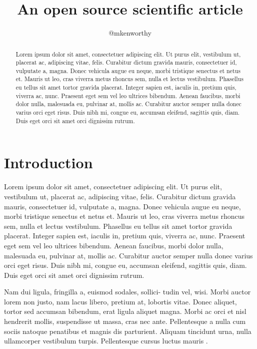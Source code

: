 \documentclass[twocolumn]{aastex631}
\begin{document}
\title{An open source scientific article}

\author{@mkenworthy}

\begin{abstract}
    Lorem ipsum dolor sit amet, consectetuer adipiscing elit. 
    Ut purus elit, vestibulum ut, placerat ac, adipiscing vitae, felis. 
    Curabitur dictum gravida mauris, consectetuer id, vulputate a, magna. 
    Donec vehicula augue eu neque, morbi tristique senectus et netus et. 
    Mauris ut leo, cras viverra metus rhoncus sem, nulla et lectus vestibulum. 
    Phasellus eu tellus sit amet tortor gravida placerat. 
    Integer sapien est, iaculis in, pretium quis, viverra ac, nunc. 
    Praesent eget sem vel leo ultrices bibendum. 
    Aenean faucibus, morbi dolor nulla, malesuada eu, pulvinar at, mollis ac. 
    Curabitur auctor semper nulla donec varius orci eget risus. 
    Duis nibh mi, congue eu, accumsan eleifend, sagittis quis, diam. 
    Duis eget orci sit amet orci dignissim rutrum.
\end{abstract}

\section{Introduction}
\label{sec:intro}

Lorem ipsum dolor sit amet, consectetuer adipiscing elit. 
Ut purus elit, vestibulum ut, placerat ac, adipiscing vitae, felis. 
Curabitur dictum gravida mauris, consectetuer id, vulputate a, magna. 
Donec vehicula augue eu neque, morbi tristique senectus et netus et. 
Mauris ut leo, cras viverra metus rhoncus sem, nulla et lectus vestibulum. 
Phasellus eu tellus sit amet tortor gravida placerat. 
Integer sapien est, iaculis in, pretium quis, viverra ac, nunc. 
Praesent eget sem vel leo ultrices bibendum. 
Aenean faucibus, morbi dolor nulla, malesuada eu, pulvinar at, mollis ac. 
Curabitur auctor semper nulla donec varius orci eget risus. 
Duis nibh mi, congue eu, accumsan eleifend, sagittis quis, diam. 
Duis eget orci sit amet orci dignissim rutrum.

Nam dui ligula, fringilla a, euismod sodales, sollici- tudin vel, wisi. 
Morbi auctor lorem non justo, nam lacus libero, pretium at, lobortis vitae. 
Donec aliquet, tortor sed accumsan bibendum, erat ligula aliquet magna. 
Morbi ac orci et nisl hendrerit mollis, suspendisse ut massa, cras nec ante. 
Pellentesque a nulla cum sociis natoque penatibus et magnis dis parturient. 
Aliquam tincidunt urna, nulla ullamcorper vestibulum turpis. 
Pellentesque cursus luctus mauris \citep{Luger2021}.


\end{document}
